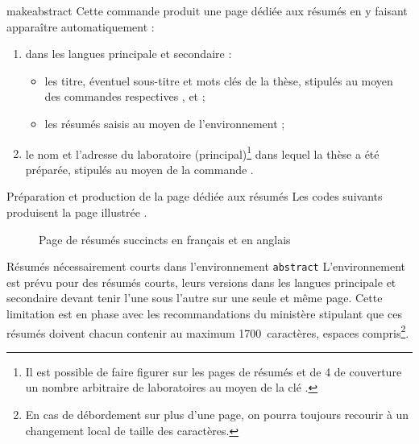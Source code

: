 \begin{docCommand}[doc description=\mandatory]{makeabstract}{}
  Cette commande produit une page dédiée aux résumés en y faisant
  apparaître automatiquement :
  \begin{enumerate}
  \item dans les langues principale et secondaire :
    \begin{itemize}
    \item les titre, éventuel sous-titre et mots clés de la thèse, stipulés au
      moyen des commandes respectives ,  et
       ;
    \item les résumés saisis au moyen de l'environnement  ;
    \end{itemize}
  \item le nom et l'adresse du laboratoire (principal)\footnote{Il est possible
      de faire figurer sur les pages de résumés et de 4\ieme{} de couverture un
      nombre arbitraire de laboratoires au moyen de la clé
      .} dans lequel la thèse a été préparée, stipulés
    au moyen de la commande .
  \end{enumerate}
\end{docCommand}

\begin{dbexample}{Préparation et production de la page dédiée aux résumés}{}
  Les codes suivants produisent la page illustrée .
\end{dbexample}

\begin{figure}[htbp]
  \centering
  \caption{Page de résumés succincts en français et en anglais}
  \label{fig-resumes-succincts}
\end{figure}

\begin{dbwarning}{Résumés nécessairement courts dans l'environnement
    \protect\lstinline+abstract+}{}
  L'environnement  est prévu pour des résumés courts, leurs
  versions dans les langues principale et secondaire devant tenir l'une sous
  l'autre sur une seule et même page. Cette limitation est en phase avec les
  recommandations du ministère stipulant que ces résumés doivent chacun
  contenir au maximum 1700~caractères, espaces compris\footnote{En cas de
    débordement sur plus d'une page, on pourra toujours recourir à un
    changement local de taille des caractères.}.
\end{dbwarning}

